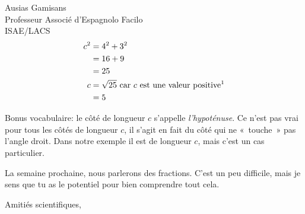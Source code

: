 \documentclass[pdftex,12pt,a4paper,origdate]{lettre}
\begin{document}
\begin{letter}{Ausias Gamisans\\ Professeur Associé d'Espagnolo
    Facilo\\ISAE/LACS}
\begin{equation*}
  \begin{split}
    c^2 & = 4^2 + 3^2\\
     & = 16 + 9\\
     & = 25\\
    c & = \sqrt{25} \text{ car $c$ est une valeur
      positive\footnotemark}\\
      & = 5
  \end{split}
\end{equation*}


Bonus vocabulaire: le côté de longueur $c$ s'appelle
\emph{l'hypoténuse}. Ce n'est pas vrai pour tous les côtés de longueur
$c$, il s'agit en fait du côté qui ne «~touche~» pas l'angle
droit. Dans notre exemple il est de longueur $c$, mais c'est un cas
particulier.

La semaine prochaine, nous parlerons des fractions. C'est un peu
difficile, mais je sens que tu as le potentiel pour bien comprendre
tout cela.

\closing{Amitiés scientifiques,}


\end{letter}
\end{document}
